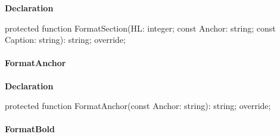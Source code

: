 \documentclass{report}
\newif\ifpdf
\begin{document}
\label{PasDoc_GenHtml.TGenericHTMLDocGenerator-FormatSection}
\begin{list}{}{
\setlength{\itemindent}{0cm}
\setlength{\listparindent}{0cm}
\setlength{\leftmargin}{\evensidemargin}
\addtolength{\leftmargin}{\tmplength}
\settowidth{\labelsep}{X}
\addtolength{\leftmargin}{\labelsep}
\setlength{\labelwidth}{\tmplength}
}
\item[\textbf{Declaration}\hfill]
\ifpdf
\begin{flushleft}
\fi
\begin{ttfamily}
protected function FormatSection(HL: integer; const Anchor: string; const Caption: string): string; override;\end{ttfamily}

\ifpdf
\end{flushleft}
\fi

\end{list}
\paragraph*{FormatAnchor}\hspace*{\fill}

\label{PasDoc_GenHtml.TGenericHTMLDocGenerator-FormatAnchor}
\begin{list}{}{
\setlength{\itemindent}{0cm}
\setlength{\listparindent}{0cm}
\setlength{\leftmargin}{\evensidemargin}
\addtolength{\leftmargin}{\tmplength}
\settowidth{\labelsep}{X}
\addtolength{\leftmargin}{\labelsep}
\setlength{\labelwidth}{\tmplength}
}
\item[\textbf{Declaration}\hfill]
\ifpdf
\begin{flushleft}
\fi
\begin{ttfamily}
protected function FormatAnchor(const Anchor: string): string; override;\end{ttfamily}

\ifpdf
\end{flushleft}
\fi

\end{list}
\paragraph*{FormatBold}\hspace*{\fill}
\end{document}
